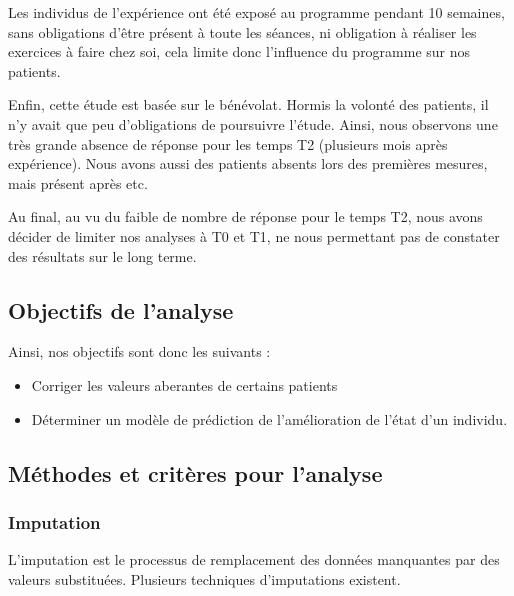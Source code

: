 \documentclass[]{article}
\providecommand{\tightlist}{%
  \setlength{\itemsep}{0pt}\setlength{\parskip}{0pt}}
\begin{document}
Les individus de l'expérience ont été exposé au programme pendant 10
semaines, sans obligations d'être présent à toute les séances, ni
obligation à réaliser les exercices à faire chez soi, cela limite donc
l'influence du programme sur nos patients.

Enfin, cette étude est basée sur le bénévolat. Hormis la volonté des
patients, il n'y avait que peu d'obligations de poursuivre l'étude.
Ainsi, nous observons une très grande absence de réponse pour les temps
T2 (plusieurs mois après expérience). Nous avons aussi des patients
absents lors des premières mesures, mais présent après etc.

Au final, au vu du faible de nombre de réponse pour le temps T2, nous
avons décider de limiter nos analyses à T0 et T1, ne nous permettant pas
de constater des résultats sur le long terme.

\hypertarget{objectifs-de-lanalyse}{%
\subsection{Objectifs de l'analyse}\label{objectifs-de-lanalyse}}

Ainsi, nos objectifs sont donc les suivants :

\begin{itemize}
\tightlist
\item
  Corriger les valeurs aberantes de certains patients
\item
  Déterminer un modèle de prédiction de l'amélioration de l'état d'un
  individu.
\end{itemize}

\hypertarget{muxe9thodes-et-crituxe8res-pour-lanalyse}{%
\subsection{Méthodes et critères pour
l'analyse}\label{muxe9thodes-et-crituxe8res-pour-lanalyse}}

\hypertarget{imputation}{%
\subsubsection{Imputation}\label{imputation}}

L'imputation est le processus de remplacement des données manquantes par
des valeurs substituées. Plusieurs techniques d'imputations existent.
\end{document}
